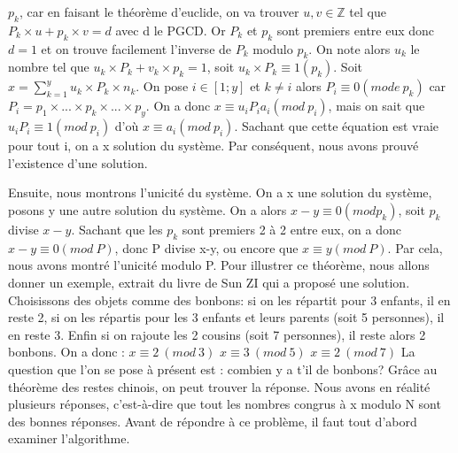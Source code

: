 \documentclass[a4paper, 11pt]{report}
\begin{document}
$p_k$, car en faisant le théorème d'euclide, on va trouver $u,v\in \mathbb{Z}$ tel que $P_k\times u + p_k \times v = d$ avec d le PGCD. Or $P_k$ et $p_k$ sont premiers entre eux donc $d=1$ et on trouve facilement l'inverse de $P_k$ modulo $p_k$. \newline
On note alors $u_k$ le nombre tel que $u_k\times P_k + v_k\times p_k= 1$, soit $u_k\times P_k\equiv 1(p_k)$. \newline
Soit $x=\sum_{k = 1}^{y} u_k\times P_k\times n_k$. On pose $i\in [1;y]$ et $k\neq i$ alors $P_i\equiv 0(mode \: p_k)$ car $P_i=p_1\times ... \times p_k \times ...\times p_y$. \newline
On a donc $x\equiv u_i P_i a_i(mod \: p_i)$, mais on sait que $u_i P_i\equiv 1 (mod \: p_i)$ d'où $x\equiv a_i (mod \: p_i)$. Sachant que cette équation est vraie pour tout i, on a x solution du système. \newline
Par conséquent, nous avons prouvé l'existence d'une solution.

Ensuite, nous montrons l'unicité du système. \newline
On a x une solution du système, posons y une autre solution du système. On a alors $x-y\equiv 0( mod p_k)$, soit $p_k$ divise $x-y$. Sachant que les $p_k$ sont premiers 2 à 2 entre eux, on a donc $x-y\equiv 0(mod \: P)$, donc P divise x-y, ou encore que $x\equiv y (mod \: P)$. Par cela, nous avons montré l'unicité modulo P.
\newline
\newline
\newline
\newline
\newline
Pour illustrer ce théorème, nous allons donner un exemple, extrait du livre de Sun ZI qui a proposé une solution.
\newline
Choisissons des objets comme des bonbons: si on les répartit pour 3 enfants, il en reste 2, si on les répartis
pour les 3 enfants et leurs parents (soit 5 personnes), il en reste 3. Enfin si on rajoute les 2 cousins
(soit 7 personnes), il reste alors 2 bonbons. On a donc :
\newline 
\newline
$ x\equiv 2 \: (mod \:  3)$ 
\newline
$ x\equiv 3 \: (mod \: 5)$
\newline
$ x\equiv 2 \:(mod\: 7)$
\newline
\newline 
La question que l'on se pose à présent est : combien y a t'il de bonbons?
\newline
Grâce au théorème des restes chinois, on peut trouver la réponse. Nous avons en réalité plusieurs réponses, c'est-à-dire que tout les nombres congrus à x modulo N sont des bonnes réponses.
Avant de répondre à ce problème, il faut tout d'abord examiner l'algorithme.
\end{document}
